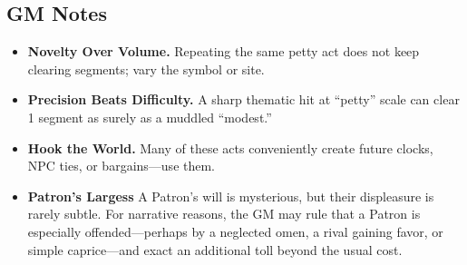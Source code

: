 \subsection*{GM Notes}\label{subsec:acts-service-gm}
\begin{itemize}
\item \textbf{Novelty Over Volume.} Repeating the same petty act does not keep clearing segments; vary the symbol or site.
\item \textbf{Precision Beats Difficulty.} A sharp thematic hit at “petty” scale can clear 1 segment as surely as a muddled “modest.”
\item \textbf{Hook the World.} Many of these acts conveniently create future clocks, NPC ties, or bargains—use them.
\item \textbf{Patron’s Largess} A Patron’s will is mysterious, but their displeasure is rarely subtle. For narrative reasons, the GM may rule that a Patron is especially offended—perhaps by a neglected omen, a rival gaining favor, or simple caprice—and exact an additional toll beyond the usual cost.
\end{itemize}
